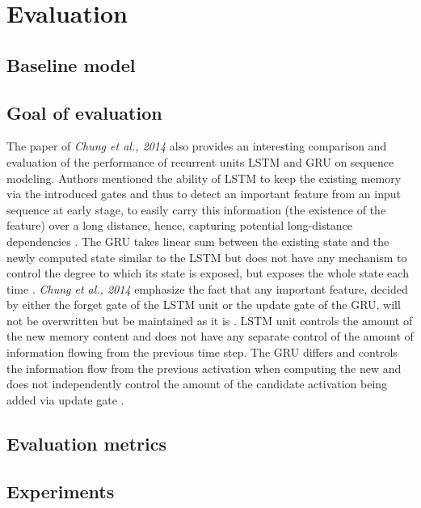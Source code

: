 
\chapter{Evaluation}
\label{sec:eval}

\section{Baseline model}
\label{sec:eval:baseline}

\section{Goal of evaluation}
\label{sec:eval:goal}

The paper of \textit{Chung et al., 2014}  also provides an interesting comparison and evaluation of the performance of recurrent units LSTM and GRU on sequence modeling. Authors mentioned the ability of LSTM to keep the existing memory via the introduced gates and thus to detect an important feature from an input sequence at early stage, to easily carry this information (the existence of the feature) over a long distance, hence, capturing potential long-distance dependencies \cite{empirical_evaluation}. The GRU takes linear sum between the existing state and the newly computed state similar to the LSTM but does not have any mechanism to control the degree to which its state is exposed, but exposes the whole state each time \cite{empirical_evaluation}. \textit{Chung et al., 2014} emphasize the fact that any important feature, decided by either the forget gate of the LSTM unit or the update gate of the GRU, will not be overwritten but be maintained as it is \cite{empirical_evaluation}. LSTM unit controls the amount of the new memory content and does not have any separate control of the amount of information flowing from the previous time step. The GRU differs and controls the information flow from the previous activation when computing the new and does not independently control the amount of the candidate activation being added via update gate \cite{empirical_evaluation}.

\section{Evaluation metrics}
\label{sec:eval:metrics}

\section{Experiments}
\label{sec:eval:experiments}

